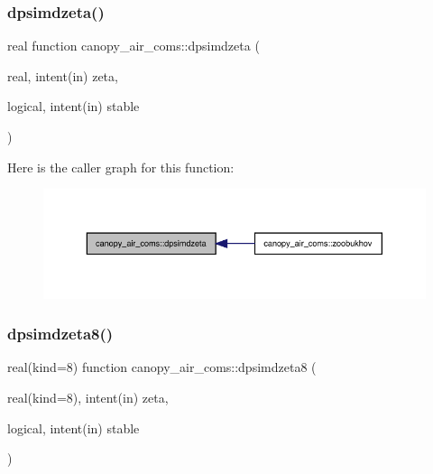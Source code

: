 \subsubsection{\texorpdfstring{dpsimdzeta()}{dpsimdzeta()}}
{\footnotesize\ttfamily real function canopy\+\_\+air\+\_\+coms\+::dpsimdzeta (\begin{DoxyParamCaption}\item[{real, intent(in)}]{zeta,  }\item[{logical, intent(in)}]{stable }\end{DoxyParamCaption})}

Here is the caller graph for this function\+:
\nopagebreak
\begin{figure}[H]
\begin{center}
\leavevmode
\includegraphics[width=350pt]{namespacecanopy__air__coms_af8bc6f1d6999a4b614461cecb85c9b1b_icgraph}
\end{center}
\end{figure}
\mbox{\label{namespacecanopy__air__coms_a51b006ac118f9549aee23ddb61a1bf19}} 
\subsubsection{\texorpdfstring{dpsimdzeta8()}{dpsimdzeta8()}}
{\footnotesize\ttfamily real(kind=8) function canopy\+\_\+air\+\_\+coms\+::dpsimdzeta8 (\begin{DoxyParamCaption}\item[{real(kind=8), intent(in)}]{zeta,  }\item[{logical, intent(in)}]{stable }\end{DoxyParamCaption})}

